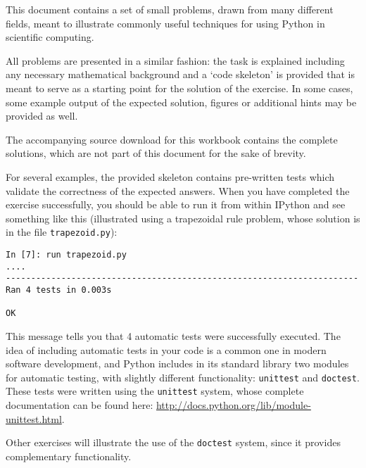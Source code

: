 This document contains a set of small problems, drawn from many different
fields, meant to illustrate commonly useful techniques for using Python
in scientific computing.

All problems are presented in a similar fashion: the task is explained
including any necessary mathematical background and a `code skeleton'
is provided that is meant to serve as a starting point for the solution
of the exercise. In some cases, some example output of the expected
solution, figures or additional hints may be provided as well. 

The accompanying source download for this workbook contains the complete
solutions, which are not part of this document for the sake of brevity.

For several examples, the provided skeleton contains pre-written tests
which validate the correctness of the expected answers. When you have
completed the exercise successfully, you should be able to run it
from within IPython and see something like this (illustrated using
a trapezoidal rule problem, whose solution is in the file \texttt{trapezoid.py}):

\begin{lstlisting}
In [7]: run trapezoid.py
....
----------------------------------------------------------------------
Ran 4 tests in 0.003s

OK
\end{lstlisting}

This message tells you that 4 automatic tests were successfully executed.
The idea of including automatic tests in your code is a common one
in modern software development, and Python includes in its standard
library two modules for automatic testing, with slightly different
functionality: \texttt{unittest} and \texttt{doctest}. These tests
were written using the \texttt{unittest} system, whose complete documentation
can be found here: \url{http://docs.python.org/lib/module-unittest.html}. 

Other exercises will illustrate the use of the \texttt{doctest} system,
since it provides complementary functionality.
